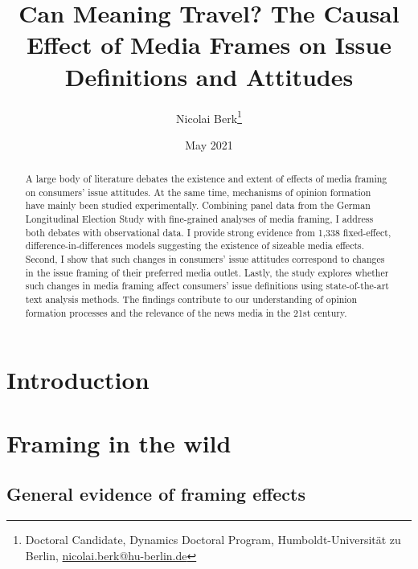 \documentclass{article}
\title{Can Meaning Travel? The Causal Effect of Media Frames on Issue Definitions and Attitudes}
\author{Nicolai Berk\footnote{Doctoral Candidate, Dynamics Doctoral Program, Humboldt-Universität zu Berlin, \href{mailto:nicolai.berk@hu-berlin.de}{nicolai.berk@hu-berlin.de}}}
\date{May 2021}
\begin{document}
\maketitle

\begin{abstract}
    A large body of literature debates the existence and extent of effects of media framing on consumers' issue attitudes. At the same time, mechanisms of opinion formation have mainly been studied experimentally. Combining panel data from the German Longitudinal Election Study with fine-grained analyses of media framing, I address both debates with observational data. I provide strong evidence from 1,338 fixed-effect, difference-in-differences models suggesting the existence of sizeable media effects. Second, I show that such changes in consumers' issue attitudes correspond to changes in the issue framing of their preferred media outlet. Lastly, the study explores whether such changes in media framing affect consumers' issue definitions using state-of-the-art text analysis methods. The findings contribute to our understanding of opinion formation processes and the relevance of the news media in the 21st century.
\end{abstract}


\section{Introduction}


\section{Framing in the wild}

\subsection{General evidence of framing effects}

\end{document}
